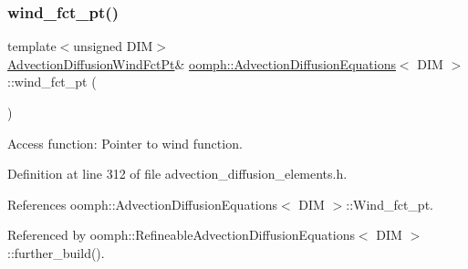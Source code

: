 \mbox{\label{classoomph_1_1AdvectionDiffusionEquations_a6f2e7c920f9789137fa6680832a5c338}} 
\subsubsection{\texorpdfstring{wind\+\_\+fct\+\_\+pt()}{wind\_fct\_pt()}\hspace{0.1cm}{\footnotesize\ttfamily [1/2]}}
{\footnotesize\ttfamily template$<$unsigned D\+IM$>$ \\
\hyperlink{classoomph_1_1AdvectionDiffusionEquations_a341db90b2eaf704f3286a9fcde7c614a}{Advection\+Diffusion\+Wind\+Fct\+Pt}\& \hyperlink{classoomph_1_1AdvectionDiffusionEquations}{oomph\+::\+Advection\+Diffusion\+Equations}$<$ D\+IM $>$\+::wind\+\_\+fct\+\_\+pt (\begin{DoxyParamCaption}{ }\end{DoxyParamCaption})\hspace{0.3cm}{\ttfamily [inline]}}



Access function\+: Pointer to wind function. 



Definition at line 312 of file advection\+\_\+diffusion\+\_\+elements.\+h.



References oomph\+::\+Advection\+Diffusion\+Equations$<$ D\+I\+M $>$\+::\+Wind\+\_\+fct\+\_\+pt.



Referenced by oomph\+::\+Refineable\+Advection\+Diffusion\+Equations$<$ D\+I\+M $>$\+::further\+\_\+build().

\mbox{\label{classoomph_1_1AdvectionDiffusionEquations_aafac11232d7d543efc4d08536b026f9a}} 

